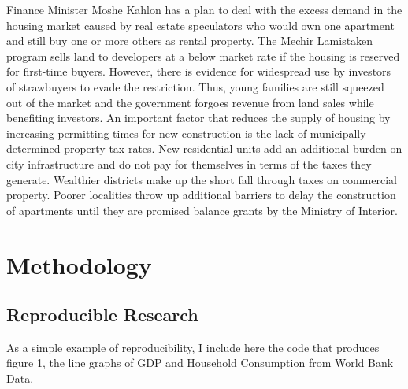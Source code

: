 \documentclass[12pt,a4paper,]{article}
\begin{document}
Finance Minister Moshe Kahlon has a plan to deal with the excess demand
in the housing market caused by real estate speculators who would own
one apartment and still buy one or more others as rental property. The
Mechir Lamistaken program sells land to developers at a below market
rate if the housing is reserved for first-time buyers. However, there is
evidence for widespread use by investors of strawbuyers to evade the
restriction. Thus, young families are still squeezed out of the market
and the government forgoes revenue from land sales while benefiting
investors. An important factor that reduces the supply of housing by
increasing permitting times for new construction is the lack of
municipally determined property tax rates. New residential units add an
additional burden on city infrastructure and do not pay for themselves
in terms of the taxes they generate. Wealthier districts make up the
short fall through taxes on commercial property. Poorer localities throw
up additional barriers to delay the construction of apartments until
they are promised balance grants by the Ministry of Interior.

\section{Methodology}\label{methodology}

\subsection{Reproducible Research}\label{reproducible-research}

As a simple example of reproducibility, I include here the code that
produces figure 1, the line graphs of GDP and Household Consumption from
World Bank Data.
\end{document}
